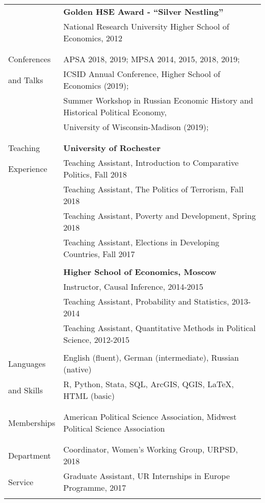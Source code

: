 \documentclass[letterpaper,11pt,oneside]{article}
\begin{document}
\begin{tabular}{@{} l l}
          & \textbf{Golden HSE Award - ``Silver Nestling''} \\
          & National Research University Higher School of Economics, 2012 \\
&           \\
& \\ 
\Large{Conferences }    
& APSA 2018, 2019; MPSA 2014, 2015, 2018, 2019;  \\
\Large{and Talks}   &  ICSID Annual Conference, Higher School of Economics (2019);\\
&Summer Workshop in Russian Economic History and Historical Political Economy,\\
& University of Wisconsin-Madison (2019);\\
 & \\
 & \\
  \Large{Teaching}  
 &\textbf{University of Rochester} \\
 \Large{Experience}   & Teaching Assistant, Introduction to Comparative Politics, Fall 2018 \\
 & Teaching Assistant, The Politics of Terrorism, Fall 2018 \\
 & Teaching Assistant, Poverty and Development, Spring 2018 \\
 & Teaching Assistant, Elections in Developing Countries, Fall 2017 \\
 \\
 &\textbf{Higher School of Economics, Moscow} \\
 & Instructor, Causal Inference, 2014-2015 \\
 & Teaching Assistant, Probability and Statistics, 2013-2014 \\
 & Teaching Assistant, Quantitative Methods in Political Science, 2012-2015 \\
 &\\ 
 \Large{Languages}   & English (fluent), German (intermediate), Russian (native) \\
\Large{and Skills}   & R, Python, Stata, SQL, ArcGIS, QGIS, \LaTeX , HTML (basic)   \\
& \\
& \\
 \Large{Memberships}   &  American Political Science Association, Midwest Political Science Association \\
& \\
& \\
\Large{Department} & Coordinator, Women's Working Group,  URPSD,  2018\\
\Large{Service} & Graduate Assistant, UR Internships in Europe Programme,  2017\\

\vspace{3em}
\end{tabular}
\end{document}
